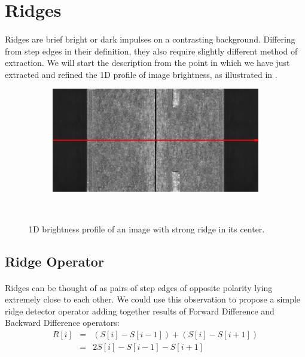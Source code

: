 \section{Ridges}

\paragraph*{}
Ridges are brief bright or dark impulses on a contrasting background. Differing from step edges in their definition, they also require slightly different method of extraction. We will start the description from the point in which we have just extracted and refined the 1D profile of image brightness, as illustrated in .

\begin{figure}[h!]
    \begin{subfigure}[b]{\basicWidth}
		\includegraphics[width=\linewidth]{img/1DEdgeDetection/ridges_scan}
    \end{subfigure}%
    ~
    \begin{subfigure}[b]{\basicWidth}
    \end{subfigure}
    \caption{1D brightness profile of an image with strong ridge in its center.}
    \label{fig:RidgesProfile}
\end{figure}

\subsection{Ridge Operator}

\paragraph*{}
Ridges can be thought of as pairs of step edges of opposite polarity lying extremely close to each other. We could use this observation to propose a simple ridge detector operator adding together results of Forward Difference and Backward Difference operators:
\begin{eqnarray*}
R[i] & = & (S[i]-S[i-1])+(S[i]-S[i+1]) \\
	& = & 2S[i]-S[i-1]-S[i+1]
\end{eqnarray*}

